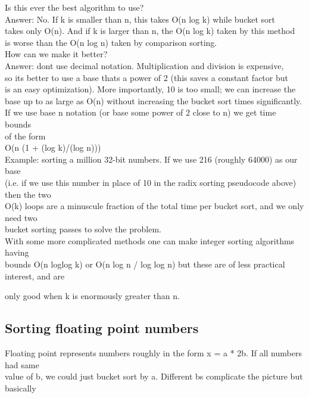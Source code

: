 \documentclass[a4paper,11pt]{article}
\begin{document}
\begin{flushleft}
{
Is this ever the best algorithm to use?
\\ }
{
\raggedleft
Answer: No. If k is smaller than n, this takes O(n log k) while bucket sort
\\ takes only O(n). And if k is larger than n, the O(n log k) taken by this method
\\ }
{
is worse than the O(n log n) taken by comparison sorting.
\\ How can we make it better?
\\ }
{
\raggedleft
Answer: dont use decimal notation. Multiplication and division is expensive,
\\ so its better to use a base thats a power of 2 (this saves a constant factor but
\\ is an easy optimization). More importantly, 10 is too small; we can increase the
\\ base up to as large as O(n) without increasing the bucket sort times significantly.
\\ If we use base n notation (or base some power of 2 close to n) we get time bounds
\\ }
{
of the form
\\ O(n (1 + (log k)/(log n)))
\\ }
{
\raggedleft
Example: sorting a million 32-bit numbers. If we use 216 (roughly 64000) as our base
\\ (i.e. if we use this number in place of 10 in the radix sorting pseudocode above) then the two
\\ O(k) loops are a minuscule fraction of the total time per bucket sort, and we only need two
\\ }
{
bucket sorting passes to solve the problem.
\\ }
{
\raggedleft
With some more complicated methods one can make integer sorting algorithms having
\\ bounds O(n loglog k) or O(n log n / log log n) but these are of less practical interest, and are
\\ }
{
only good when k is enormously greater than n.
\\ \subsection{Sorting floating point numbers}
}
{
\raggedleft
Floating point represents numbers roughly in the form x = a * 2b. If all numbers had same
\\ value of b, we could just bucket sort by a. Different bs complicate the picture but basically
}
\end{flushleft}
\end{document}
